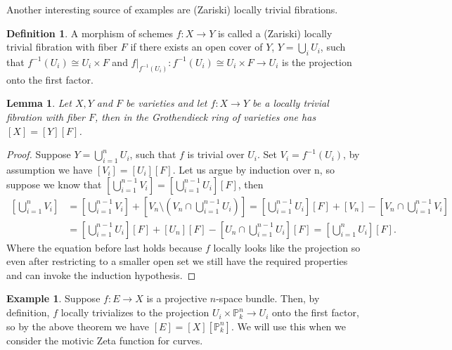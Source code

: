 \documentclass[11pt, a4paper, german, twoside]{article}
\theoremstyle{plain}
\newtheorem{lemma}[theorem]{Lemma}
\theoremstyle{definition}
\newtheorem{definition}[theorem]{Definition}
\newtheorem{example}[theorem]{Example}
\begin{document}
Another interesting source of examples are (Zariski) locally trivial fibrations.
\begin{definition}
    A morphism of schemes $f \colon X \to Y$ is called a (Zariski) locally trivial fibration with fiber $F$ if there exists an open cover of $Y$,
    $Y = \bigcup_{i} U_i$, such that $f^{-1}(U_i) \cong U_i \times F$ and $f|_{f^{-1}(U_i)} \colon f^{-1}(U_i) \cong U_i \times F \to U_i$ is
    the projection onto the first factor.
\end{definition}

\begin{lemma}
    \label{fibration}Let $X, Y$ and $F$ be varieties and
    let $f \colon X \to Y$ be a locally trivial fibration with fiber $F$, then in the Grothendieck ring of varieties
    one has $[X] = [Y][F]$.
\end{lemma}
\begin{proof}
    Suppose $Y = \bigcup_{i=1}^n U_i$, such that $f$ is trivial over $U_i$. Set $V_i = f^{-1}(U_i)$, by assumption we have $[V_i] = [U_i][F]$. 
    Let us argue by induction over n, so suppose we know that 
    $\left[ \bigcup_{i=1}^{n-1} V_i \right] = \left[\bigcup_{i=1}^{n-1} U_i \right][F]$, then
    \begin{align*}
        \left [ \bigcup_{i=1}^n V_i \right ]       
        &= \left [ \bigcup_{i=1}^{n-1} V_i \right ] + \left [ V_n \setminus (V_n \cap \bigcup_{i=1}^{n-1} U_i) \right ]
         = \left [ \bigcup_{i=1}^{n-1} U_i \right ][F] + [V_n] - \left [ V_n \cap \bigcup_{i=1}^{n-1} V_i \right ] \\
        &= \left [ \bigcup_{i=1}^{n-1} U_i \right ][F] + [U_n][F] - \left [ U_n \cap \bigcup_{i=1}^{n-1} U_i\right ][F]
         = \left [ \bigcup_{i=1}^n U_i \right ][F].
    \end{align*}
    Where the equation before last holds because $f$ locally looks like the projection so even after restricting to a smaller open set we still
    have the required properties and can invoke the induction hypothesis.
\end{proof}

\begin{example}
    \label{projBundle}
    Suppose $f \colon E \to X$ is a projective $n$-space bundle. Then, by definition, $f$ locally trivializes to the projection
    $U_i \times \mathbb{P}_k^n \to U_i$ onto the first factor, so by the above theorem we have
    $[E] = [X][\mathbb{P}_k^n]$. We will use this when we consider the motivic Zeta function for curves.
\end{example}
\end{document}
